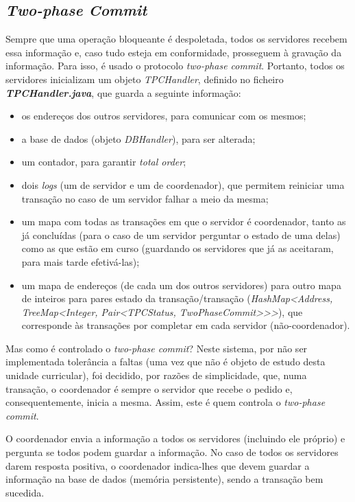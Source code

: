 \documentclass[a4paper]{report}
\begin{document}
		\subsection{\textit{Two-phase Commit}}

		Sempre que uma operação bloqueante é despoletada, todos os servidores recebem essa informação e, caso tudo esteja em conformidade, prosseguem à gravação da informação.
		Para isso, é usado o protocolo \textit{two-phase commit}. Portanto, todos os servidores inicializam um objeto \textit{TPCHandler}, definido no ficheiro \textit{\textbf{TPCHandler.java}}, 
		que guarda a seguinte informação:
		\begin{itemize}
		\item os endereços dos outros servidores, para comunicar com os mesmos;
		\item a base de dados (objeto \textit{DBHandler}), para ser alterada;
		\item um contador, para garantir \textit{total order};
		\item dois \textit{logs} (um de servidor e um de coordenador), que permitem reiniciar uma transação no caso de um servidor falhar a meio da mesma;
		\item um mapa com todas as transações em que o servidor é coordenador, tanto as já concluídas (para o caso de um servidor perguntar o estado de uma delas) como as que estão em curso (guardando os servidores que já as aceitaram, para mais tarde efetivá-las);
		\item um mapa de endereços (de cada um dos outros servidores) para outro mapa de inteiros para pares estado da transação/transação 
		(\textit{HashMap<Address, TreeMap<Integer, Pair<TPCStatus, TwoPhaseCommit>>>}), que corresponde às transações por completar em cada servidor (não-coordenador).
		\end{itemize}
		
		Mas como é controlado o \textit{two-phase commit}?
		Neste sistema, por não ser implementada tolerância a faltas (uma vez que não é objeto de estudo desta unidade curricular), foi decidido, por razões de simplicidade, 
		que, numa transação, o coordenador é sempre o servidor que recebe o pedido e, consequentemente, inicia a mesma.
		Assim, este é quem controla o \textit{two-phase commit}.

		O coordenador envia a informação a todos os servidores (incluindo ele próprio) e pergunta se todos podem guardar a informação. 
		No caso de todos os servidores darem resposta positiva, o coordenador indica-lhes que devem guardar a informação na base de dados (memória persistente), sendo a transação bem sucedida.
\end{document}
